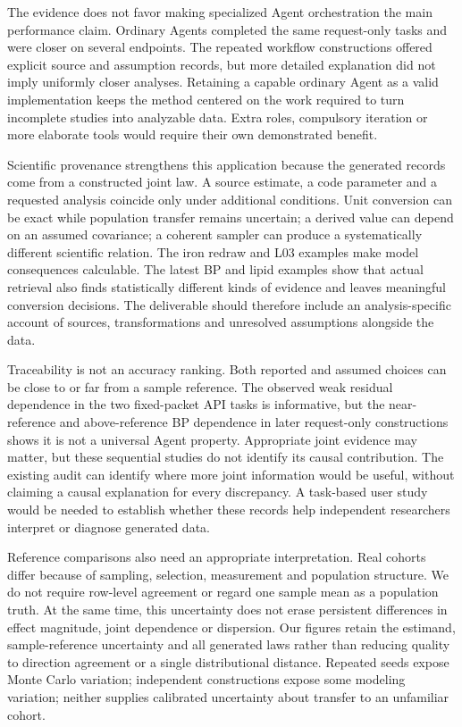 \documentclass[11pt,letterpaper]{article}
\begin{document}
The evidence does not favor making specialized Agent orchestration the main performance claim. Ordinary Agents completed the same request-only tasks and were closer on several endpoints. The repeated workflow constructions offered explicit source and assumption records, but more detailed explanation did not imply uniformly closer analyses. Retaining a capable ordinary Agent as a valid implementation keeps the method centered on the work required to turn incomplete studies into analyzable data. Extra roles, compulsory iteration or more elaborate tools would require their own demonstrated benefit.


Scientific provenance strengthens this application because the generated records come from a constructed joint law. A source estimate, a code parameter and a requested analysis coincide only under additional conditions. Unit conversion can be exact while population transfer remains uncertain; a derived value can depend on an assumed covariance; a coherent sampler can produce a systematically different scientific relation. The iron redraw and L03 examples make model consequences calculable. The latest BP and lipid examples show that actual retrieval also finds statistically different kinds of evidence and leaves meaningful conversion decisions. The deliverable should therefore include an analysis-specific account of sources, transformations and unresolved assumptions alongside the data.


Traceability is not an accuracy ranking. Both reported and assumed choices can be close to or far from a sample reference. The observed weak residual dependence in the two fixed-packet API tasks is informative, but the near-reference and above-reference BP dependence in later request-only constructions shows it is not a universal Agent property. Appropriate joint evidence may matter, but these sequential studies do not identify its causal contribution. The existing audit can identify where more joint information would be useful, without claiming a causal explanation for every discrepancy. A task-based user study would be needed to establish whether these records help independent researchers interpret or diagnose generated data.


Reference comparisons also need an appropriate interpretation. Real cohorts differ because of sampling, selection, measurement and population structure. We do not require row-level agreement or regard one sample mean as a population truth. At the same time, this uncertainty does not erase persistent differences in effect magnitude, joint dependence or dispersion. Our figures retain the estimand, sample-reference uncertainty and all generated laws rather than reducing quality to direction agreement or a single distributional distance. Repeated seeds expose Monte Carlo variation; independent constructions expose some modeling variation; neither supplies calibrated uncertainty about transfer to an unfamiliar cohort.
\end{document}
